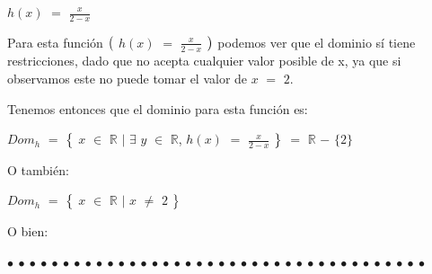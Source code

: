 \documentclass[12pt]{article}
\newenvironment{MyColorPar}[1]{%
    \leavevmode\color{#1}\ignorespaces%
}{%
}%
\begin{document}
\begin{MyColorPar}{darkmagenta} 
   $h(x)$ $=$ {\LARGE{$\frac{x}{2-x}$}}
    \end{MyColorPar} \vspace{0.5cm}

\begin{MyColorPar}{darkmagenta} \bfseries{
{} 
Para esta función $\big{(}$  $h(x)$ $=$ {\LARGE{$\frac{x}{2-x}$}} $\big{)}$ podemos ver que el dominio sí tiene restricciones, dado que no acepta cualquier valor posible de x, ya que si observamos este no puede tomar el valor de $x$ $=$ $2$. \vspace{0.5cm}

Tenemos entonces que el dominio para esta función es: \vspace{0.5cm}

\hspace{2cm} $Dom_{h}$ $=$ $\big{\{}$ $x$ $\in$ $\mathbb{R}$ $\mid$ $\exists$ $y$ $\in$ $\mathbb{R}$, $h(x)$ $=$ {\LARGE{$\frac{x}{2-x}$}} $\big{\}}$ $=$ $\mathbb{R}$ $-$ $\{ 2 \}$ \vspace{0.5cm}

O también: 

\hspace{2cm} $Dom_{h}$ $=$ $\big{\{}$ $x$ $\in$ $\mathbb{R}$ $\mid$  $x$ $\neq$ $2$  $\big{\}}$ \vspace{0.5cm}

O bien: 

\hspace{3cm}  \vspace{0.5cm}
}
\end{MyColorPar}


\begin{MyColorPar}{Saffron} \bfseries{
 $\bullet$ $\bullet$ $\bullet$ $\bullet$ $\bullet$ $\bullet$ $\bullet$ $\bullet$ $\bullet$ $\bullet$ $\bullet$ $\bullet$ $\bullet$ $\bullet$ $\bullet$ $\bullet$ $\bullet$ $\bullet$ $\bullet$ $\bullet$ $\bullet$ $\bullet$ $\bullet$ $\bullet$ $\bullet$ $\bullet$ $\bullet$ $\bullet$ $\bullet$ $\bullet$ $\bullet$ $\bullet$ $\bullet$ $\bullet$ $\bullet$ $\bullet$ $\bullet$ $\bullet$  }
\end{MyColorPar}
\end{document}
